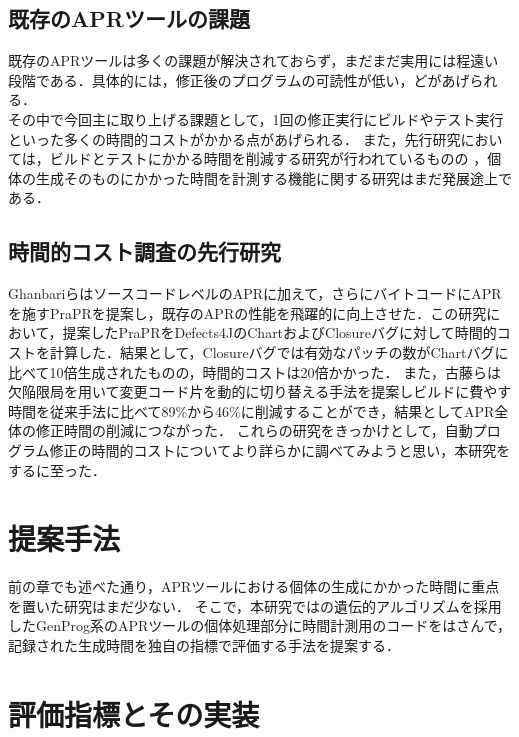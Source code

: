 \documentclass[uplatex,dvipdfmx,a4paper]{jsarticle}
\let\oldcite\cite
\renewcommand{\cite}[1]{\xspace\oldcite{#1}}
\begin{document}
\subsection{既存のAPRツールの課題} \label{sec:prev_challenge}
既存のAPRツールは多くの課題が解決されておらず\cite{le2013current}，まだまだ実用には程遠い段階である．具体的には，修正後のプログラムの可読性が低い\cite{smith2015cure}，どがあげられる．\\
その中で今回主に取り上げる課題として，1回の修正実行にビルドやテスト実行といった多くの時間的コストがかかる点\cite{chen2017contract}があげられる．
また，先行研究においては，ビルドとテストにかかる時間を削減する研究が行われているものの\cite{id692}
，個体の生成そのものにかかった時間を計測する機能に関する研究はまだ発展途上である．
\subsection{時間的コスト調査の先行研究}
Ghanbari\cite{ghanbari2019practical}らはソースコードレベルのAPRに加えて，さらにバイトコードにAPRを施すPraPRを提案し，既存のAPRの性能を飛躍的に向上させた．この研究において，提案したPraPRをDefects4JのChartおよびClosureバグに対して時間的コストを計算した．結果として，Closureバグでは有効なパッチの数がChartバグに比べて10倍生成されたものの，時間的コストは20倍かかった．
また，古藤\cite{id692}らは欠陥限局を用いて変更コード片を動的に切り替える手法を提案しビルドに費やす時間を従来手法に比べて89\%から46\%に削減することができ，結果としてAPR全体の修正時間の削減につながった．
これらの研究をきっかけとして，自動プログラム修正の時間的コストについてより詳らかに調べてみようと思い，本研究をするに至った．
\clearpage
\section{提案手法} \label{sec:sgst}
前の章でも述べた通り，APRツールにおける個体の生成にかかった時間に重点を置いた研究はまだ少ない．
そこで，本研究ではの遺伝的アルゴリズムを採用したGenProg\cite{le2011genprog}系のAPRツールの個体処理部分に時間計測用のコードをはさんで，記録された生成時間を独自の指標で評価する手法を提案する．
\clearpage
\section{評価指標とその実装} \label{sec:prop}
\end{document}
